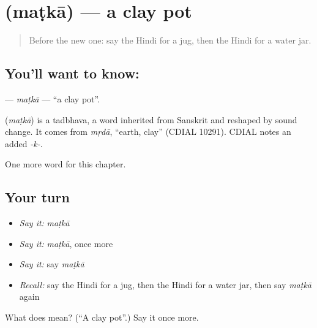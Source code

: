 \section[\texorpdfstring{\hi{मटका} (maṭkā)}{मटका (maṭkā)}]{ (maṭkā) — a clay pot}

\label{lesson:HI-C270-matka}



\begin{quote}
Before the new one: say the Hindi for a jug, then the Hindi for a water jar.
\end{quote}

\subsection*{You'll want to know: }
\textbf{} — \emph{maṭkā} — \textquotedblleft{}a clay pot\textquotedblright{}.

\begin{cousinweb}
\textbf{} (\emph{maṭkā}) is a tadbhava, a word inherited from Sanskrit and reshaped by sound change. It comes from \emph{mṛdā}, \textquotedblleft{}earth, clay\textquotedblright{} (CDIAL 10291). CDIAL notes an added \emph{-k-}.
\end{cousinweb}

\begin{grammarlens}[title={What you've built}]
One more word for this chapter.
\end{grammarlens}

\subsection*{Your turn}
\begin{itemize}
\raggedright
  \item \emph{Say it:} \emph{maṭkā}
  \item \emph{Say it:} \emph{maṭkā}, once more
  \item \emph{Say it:} say \emph{maṭkā}
  \item \emph{Recall:} say the Hindi for a jug, then the Hindi for a water jar, then say \emph{maṭkā} again
\end{itemize}

\begin{tcolorbox}[breakable,colback=teal!4,colframe=teal!35!black,title={Before you move on}]
What does  mean? (\textquotedblleft{}A clay pot\textquotedblright{}.) Say it once more.
\end{tcolorbox}
